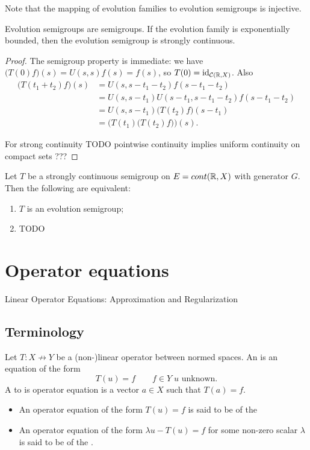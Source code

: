 Note that the mapping of evolution families to evolution semigroups is injective.

\begin{lemma}
Evolution semigroups are semigroups. If the evolution family is exponentially bounded, then the evolution semigroup is strongly continuous.
\end{lemma}
\begin{proof}
The semigroup property is immediate: we have $\big(T(0)f\big)(s) = U(s,s)f(s) = f(s)$, so $T(0) = \operatorname{id}_{\operatorname{\mathcal{C}}(\mathbb{R},X)}$. Also
\begin{align*}
\big(T(t_1+t_2)f\big)(s) &= U(s,s-t_1-t_2)f(s-t_1-t_2) \\
&= U(s,s-t_1)U(s-t_1,s-t_1-t_2)f(s-t_1-t_2) \\
&= U(s,s-t_1)\big(T(t_2)f\big)(s-t_1) \\
&= \Big(T(t_1)\big(T(t_2)f\big)\Big)(s).
\end{align*}


For strong continuity TODO pointwise continuity implies uniform continuity on compact sets ???
\end{proof}

\begin{proposition}
Let $T$ be a strongly continuous semigroup on $E = cont(\mathbb{R},X)$ with generator $G$. Then the following are equivalent:
\begin{enumerate}
\item $T$ is an evolution semigroup;
\item TODO
\end{enumerate}
\end{proposition}



\chapter{Operator equations}
Linear Operator Equations: Approximation and Regularization
\section{Terminology}
\begin{definition}
Let $T: X\not\to Y$ be a (non-)linear operator between normed spaces. An  is an equation of the form
\[ T(u) = f \qquad f\in Y\; \text{$u$ unknown.} \]
A  to is operator equation is a vector $a\in X$ such that $T(a) = f$.

\begin{itemize}
\item An operator equation of the form $T(u) = f$ is said to be of the 
\item An operator equation of the form $\lambda u - T(u) = f$ for some non-zero scalar $\lambda$ is said to be of the .
\end{itemize}
\end{definition}

